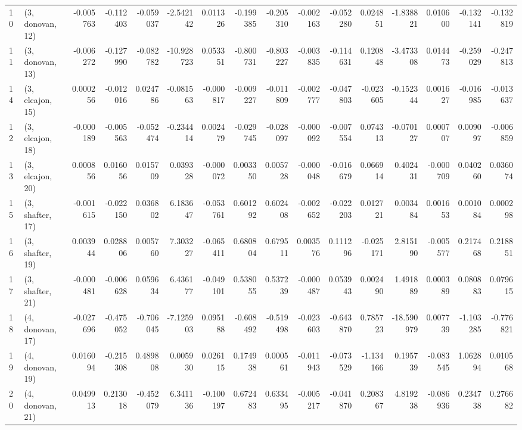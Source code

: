 \begin{tabular}{llrrrrrrrrrrrrrr}
10 &  (3, donovan, 12) &  -0.005763 & -0.112403 & -0.059037 &  -2.542142 &  0.011326 &  -0.199385 & -0.205310 & -0.002163 & -0.052280 &  0.024851 &  -1.838821 &  0.010600 & -0.132141 & -0.132819 \\
11 &  (3, donovan, 13) &  -0.006272 & -0.127990 & -0.082782 & -10.928723 &  0.053351 &  -0.800731 & -0.803227 & -0.003835 & -0.114631 &  0.120848 &  -3.473308 &  0.014473 & -0.259029 & -0.247813 \\
14 &  (3, elcajon, 15) &   0.000256 & -0.012016 &  0.024786 &  -0.081563 & -0.000817 &  -0.009227 & -0.011809 & -0.002777 & -0.047803 & -0.023605 &  -0.152344 &  0.001627 & -0.016985 & -0.013637 \\
12 &  (3, elcajon, 18) &  -0.000189 & -0.005563 & -0.052474 &  -0.234414 &  0.002479 &  -0.029745 & -0.028097 & -0.000092 & -0.007554 &  0.074313 &  -0.070127 &  0.000707 &  0.009097 & -0.006859 \\
13 &  (3, elcajon, 20) &   0.000856 &  0.016056 &  0.015709 &   0.039328 & -0.000072 &   0.003350 &  0.005728 & -0.000048 & -0.016679 &  0.066914 &   0.402431 & -0.000709 &  0.040260 &  0.036074 \\
15 &  (3, shafter, 17) &  -0.001615 & -0.022150 &  0.036802 &   6.183647 & -0.053761 &   0.601292 &  0.602408 & -0.002652 & -0.022203 &  0.012721 &   0.003484 &  0.001653 &  0.001084 &  0.000298 \\
16 &  (3, shafter, 19) &   0.003944 &  0.028806 &  0.005760 &   7.303227 & -0.065411 &   0.680804 &  0.679511 &  0.003576 &  0.111296 & -0.025171 &   2.815190 & -0.005577 &  0.217468 &  0.218851 \\
17 &  (3, shafter, 21) &  -0.000481 & -0.006628 &  0.059634 &   6.436177 & -0.049101 &   0.538055 &  0.537239 & -0.000487 &  0.053943 &  0.002490 &   1.491889 &  0.000389 &  0.080883 &  0.079615 \\
18 &  (4, donovan, 17) &  -0.027696 & -0.475052 & -0.706045 &  -7.125903 &  0.095188 &  -0.608492 & -0.519498 & -0.023603 & -0.643870 &  0.785723 & -18.590979 &  0.007739 & -1.103285 & -0.776821 \\
19 &  (4, donovan, 19) &   0.016094 & -0.215308 &  0.489808 &   0.005930 &  0.026115 &   0.174938 &  0.000561 & -0.011943 & -0.073529 & -1.134166 &   0.195739 & -0.083545 &  1.062894 &  0.010568 \\
20 &  (4, donovan, 21) &   0.049913 &  0.213018 & -0.452079 &   6.341136 & -0.100197 &   0.672483 &  0.633495 & -0.005217 & -0.041870 &  0.208367 &   4.819238 & -0.086936 &  0.234738 &  0.276682 \\

\end{tabular}
